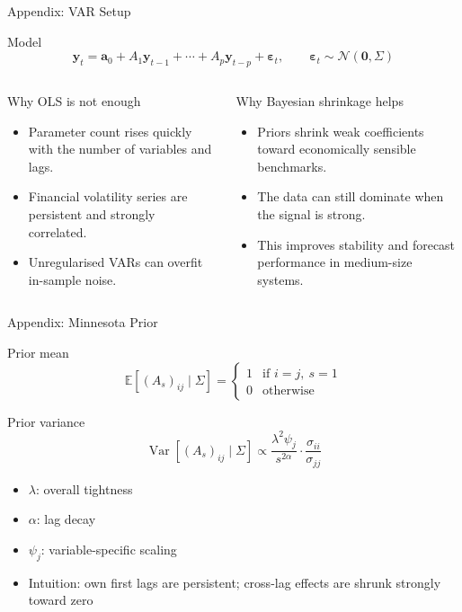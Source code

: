 \documentclass[10pt, aspectratio=169]{beamer}
\begin{document}
\begin{frame}{Appendix: VAR Setup}
\small
\begin{block}{Model}
\[
  \boldsymbol{y}_{t} = \boldsymbol{a}_0 + A_1 \boldsymbol{y}_{t-1} + \cdots + A_p \boldsymbol{y}_{t-p} + \boldsymbol{\varepsilon}_t,
  \qquad
  \boldsymbol{\varepsilon}_t \sim \mathcal{N}(\boldsymbol{0}, \Sigma)
\]
\end{block}

\begin{columns}[T,onlytextwidth]
  \begin{block}{Why OLS is not enough}
  \begin{itemize}
    \item Parameter count rises quickly with the number of variables and lags.
    \item Financial volatility series are persistent and strongly correlated.
    \item Unregularised VARs can overfit in-sample noise.
  \end{itemize}
  \end{block}

  \begin{block}{Why Bayesian shrinkage helps}
  \begin{itemize}
    \item Priors shrink weak coefficients toward economically sensible benchmarks.
    \item The data can still dominate when the signal is strong.
    \item This improves stability and forecast performance in medium-size systems.
  \end{itemize}
  \end{block}
\end{columns}
\end{frame}

\begin{frame}{Appendix: Minnesota Prior}
\small
\begin{block}{Prior mean}
\[
  \mathbb{E}\!\left[(A_s)_{ij}\mid\Sigma\right] =
  \begin{cases}
    1 & \text{if } i=j,\ s=1 \\
    0 & \text{otherwise}
  \end{cases}
\]
\end{block}

\begin{block}{Prior variance}
\[
  \operatorname{Var}\!\left[(A_s)_{ij}\mid\Sigma\right]
  \propto
  \frac{\lambda^2 \psi_j}{s^{2\alpha}}
  \cdot
  \frac{\sigma_{ii}}{\sigma_{jj}}
\]
\end{block}

\begin{itemize}
  \item $\lambda$: overall tightness
  \item $\alpha$: lag decay
  \item $\psi_j$: variable-specific scaling
  \item Intuition: own first lags are persistent; cross-lag effects are shrunk strongly toward zero
\end{itemize}
\end{frame}
\end{document}
